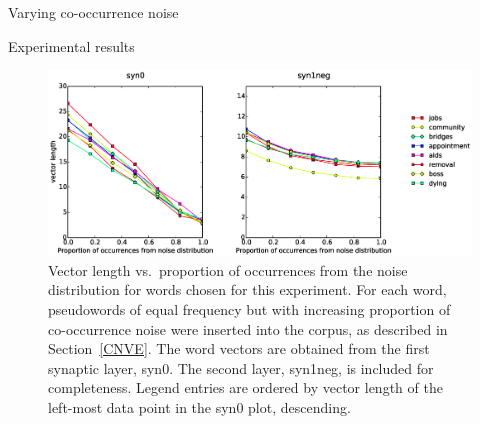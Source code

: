 \documentclass{article} %
\begin{document}
\begin{section}{Varying co-occurrence noise}
\begin{subsection}{Experimental results}
\begin{figure}
	\includegraphics[scale=0.6]{cooccurrence-noise-graph}
	\caption{ Vector length vs.\ proportion of occurrences from the noise distribution
          for words chosen for this experiment.  For each word, pseudowords
          of equal frequency but with increasing proportion of
          co-occurrence noise were inserted into the corpus, as
          described in Section~\ref{CNVE}.  The word vectors are
          obtained from the first synaptic layer, syn0.  The second
          layer, syn1neg, is included for completeness.  Legend entries
          are ordered by vector length of the left-most data point in
          the syn0 plot, descending.}
	\label{fig:co-occurrence-noise-graph}
\end{figure}

\end{subsection}

\end{section}
\end{document}
